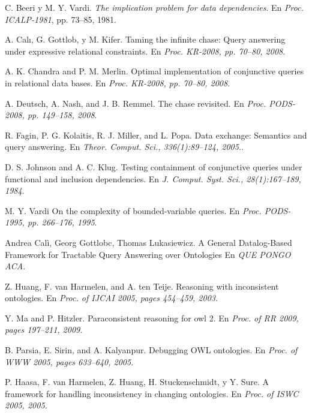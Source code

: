 \documentclass[11pt,a4paper,twoside]{tesis}
\begin{document}
\backmatter
\begin{thebibliography}{9}
    C. Beeri y M. Y. Vardi.
    \textit{The implication problem for data dependencies}. 
    En \textit{Proc. ICALP-1981}, pp. 73–85, 1981.
     
    A. Calı, G. Gottlob, y M. Kifer.
    Taming the infinite chase: Query answering under expressive relational constraints.
    En \textit{Proc. KR-2008, pp. 70–80, 2008}. 

    A. K. Chandra and P. M. Merlin. 
    Optimal implementation of conjunctive queries in relational data bases.
    En \textit{Proc. KR-2008, pp. 70–80, 2008}. 

    A. Deutsch, A. Nash, and J. B. Remmel.
    The chase revisited.
    En \textit{Proc. PODS-2008, pp. 149–158, 2008}. 

    R. Fagin, P. G. Kolaitis, R. J. Miller, and L. Popa.
    Data exchange: Semantics and query answering.
    En \textit{Theor. Comput. Sci., 336(1):89–124, 2005.}. 

    D. S. Johnson and A. C. Klug.
    Testing containment of conjunctive queries under functional and inclusion dependencies.
    En \textit{J. Comput. Syst. Sci., 28(1):167–189, 1984}. 

    M. Y. Vardi
    On the complexity of bounded-variable queries.
    En \textit{Proc. PODS-1995, pp. 266–176, 1995}. 
    
    Andrea Calì, Georg Gottlobc, Thomas Lukasiewicz.
    A General Datalog-Based Framework for Tractable Query Answering over Ontologies
    En \textit{QUE PONGO ACA}. 
    
    Z. Huang, F. van Harmelen, and A. ten Teije.
    Reasoning with inconsistent ontologies.
    En \textit{Proc. of IJCAI 2005, pages 454–459, 2003}. 
    
    Y. Ma and P. Hitzler.
    Paraconsistent reasoning for owl 2.
    En \textit{Proc. of RR 2009, pages 197–211, 2009.} 
    
    B. Parsia, E. Sirin, and A. Kalyanpur.
    Debugging OWL ontologies.
    En \textit{Proc. of WWW 2005, pages 633–640, 2005.} 

    P. Haasa, F. van Harmelen, Z. Huang, H. Stuckenschmidt, y Y. Sure.
    A framework for handling inconsistency in changing ontologies.
    En \textit{Proc. of ISWC 2005, 2005.} 


\end{thebibliography}
\end{document}
